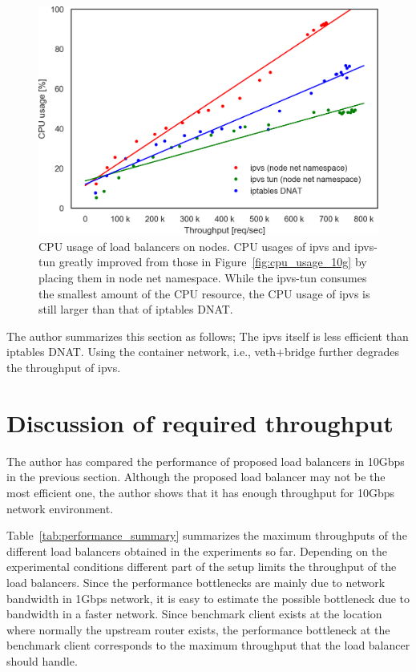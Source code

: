 \begin{figure}[h]
  \centering
  \includegraphics[width=0.8\columnwidth]{Figs/cpu_usage_10g_node_ns}
  \par\bigskip
  \centering
  \begin{minipage}{0.9\columnwidth}
    \caption[CPU usage of load balancers on nodes]{
      CPU usage of load balancers on nodes.
      CPU usages of ipvs and ipvs-tun greatly improved from those in Figure~\ref{fig:cpu_usage_10g} by placing them in node net namespace.  
      While the ipvs-tun consumes the smallest amount of the CPU resource, the CPU usage of ipvs is still larger than that of iptables DNAT.
    }
    \label{fig:cpu_usage_10g_node_ns}
  \end{minipage}
\end{figure}

The author summarizes this section as follows;
The ipvs itself is less efficient than iptables DNAT.
Using the container network, i.e., veth+bridge further degrades the throughput of ipvs.

\FloatBarrier

\section{Discussion of required throughput}

The author has compared the performance of proposed load balancers in 10Gbps in the previous section.
Although the proposed load balancer may not be the most efficient one, the author shows that it has enough throughput for 10Gbps network environment.

Table~\ref{tab:performance_summary} summarizes the maximum throughputs of the different load balancers obtained in the experiments so far.
Depending on the experimental conditions different part of the setup limits the throughput of the load balancers.
Since the performance bottlenecks are mainly due to network bandwidth in 1Gbps network, it is easy to estimate the possible bottleneck due to bandwidth in a faster network.
Since benchmark client exists at the location where normally the upstream router exists, the performance bottleneck at the benchmark client corresponds to the maximum throughput that the load balancer should handle.

